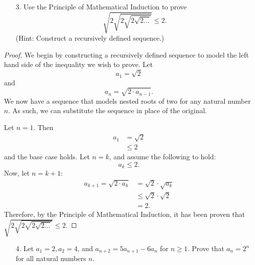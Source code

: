\documentclass[10pt]{article}
\theoremstyle{definition}
\theoremstyle{plain}
\begin{document}
\pagebreak



\begin{enumerate}
  \item[3.] Use the Principle of Mathematical Induction to prove
  $$\sqrt{2\sqrt{2\sqrt{2\sqrt{2\dots}}}} \leq 2.$$
  (Hint:  Construct a recursively defined sequence.)
\end{enumerate}

\setcounter{equation}{0}
\begin{proof}
    We begin by constructing a recursively defined sequence to model the left hand side of the inequality we wish to prove. Let
    $$
        a_1 = \sqrt{2}
    $$
    and
    $$
        a_n = \sqrt{2\cdot a_{n-1}}.
    $$
    We now have a sequence that models nested roots of two for any natural number $n$. As such, we can substitute the sequence in place of the original.
    
    Let $n=1$. Then
    \begin{align*}
        a_1 &= \sqrt{2} \\
            &\leq 2
    \end{align*}
    and the base case holds. Let $n=k$, and assume the following to hold:
    $$
        a_k \leq 2.
    $$
    Now, let $n=k+1:$
    \begin{align*}
        a_{k+1} = \sqrt{2\cdot a_k} &= \sqrt{2}\cdot\sqrt{a_k} \\
                                    &\leq \sqrt{2} \cdot \sqrt{2} \\
                                    &= 2.
    \end{align*}
    Therefore, by the Principle of Mathematical Induction, it has been proven that $\sqrt{2\sqrt{2\sqrt{2\sqrt{2\dots}}}} \leq 2.$
\end{proof}



\pagebreak



\begin{enumerate}
  \item[4.] Let $a_1 = 2, a_2 = 4$, and $a_{n+2} = 5a_{n+1} - 6a_n$ for $n \geq 1$.  Prove that $a_n = 2^n$ for all natural numbers $n$.
\end{enumerate}
\end{document}
